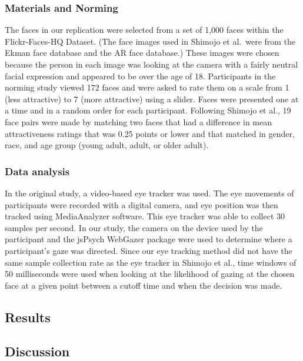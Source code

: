 \documentclass[
  english,
  man,floatsintext]{apa6}
\begin{document}
\hypertarget{materials-and-norming}{%
\subsubsection{Materials and Norming}\label{materials-and-norming}}

The faces in our replication were selected from a set of 1,000 faces within the Flickr-Faces-HQ Dataset. (The face images used in Shimojo et al.~were from the Ekman face database and the AR face database.) These images were chosen because the person in each image was looking at the camera with a fairly neutral facial expression and appeared to be over the age of 18. Participants in the norming study viewed 172 faces and were asked to rate them on a scale from 1 (less attractive) to 7 (more attractive) using a slider. Faces were presented one at a time and in a random order for each participant. Following Shimojo et al., 19 face pairs were made by matching two faces that had a difference in mean attractiveness ratings that was 0.25 points or lower and that matched in gender, race, and age group (young adult, adult, or older adult).

\hypertarget{data-analysis-2}{%
\subsubsection{Data analysis}\label{data-analysis-2}}

In the original study, a video-based eye tracker was used. The eye movements of participants were recorded with a digital camera, and eye position was then tracked using MediaAnalyzer software. This eye tracker was able to collect 30 samples per second. In our study, the camera on the device used by the participant and the jsPsych WebGazer package were used to determine where a participant's gaze was directed. Since our eye tracking method did not have the same sample collection rate as the eye tracker in Shimojo et al., time windows of 50 milliseconds were used when looking at the likelihood of gazing at the chosen face at a given point between a cutoff time and when the decision was made.

\hypertarget{results-4}{%
\subsection{Results}\label{results-4}}

\hypertarget{discussion-4}{%
\subsection{Discussion}\label{discussion-4}}
\end{document}
